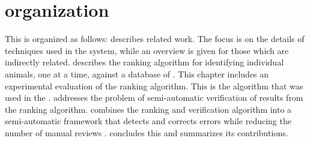 
\section{\Thesis{} organization} %
    This \thesis{} is organized as follows:
     describes related work.
    The focus is on the details of techniques used in the system, while an overview is given for those which are
      indirectly related.
     describes the ranking algorithm for identifying individual animals, one \annot{} at a
      time, against a database of \exemplars{}.
    This chapter includes an experimental evaluation of the ranking algorithm.
    This is the algorithm that was used in the \GZC{}.
     addresses the problem of semi-automatic verification of results from the ranking
      algorithm.
     combines the ranking and verification algorithm into a semi-automatic framework that
      detects and corrects errors while reducing the number of manual reviews .
     concludes this \thesis{} and summarizes its contributions.
